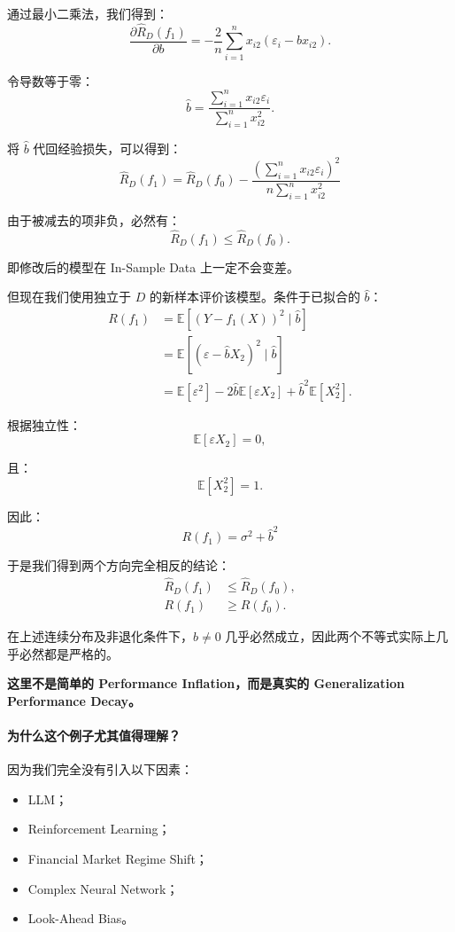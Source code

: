 通过最小二乘法，我们得到：
\[\frac{\partial\widehat R_D(f_1)}
{\partial b}
=
-\frac2n
\sum_{i=1}^{n}
x_{i2}(\varepsilon_i-bx_{i2}).\]

令导数等于零：
\[\hat b
=
\frac{\sum_{i=1}^{n}x_{i2}\varepsilon_i}
{\sum_{i=1}^{n}x_{i2}^2}.\]

将 \(\hat b\) 代回经验损失，可以得到：
\[\boxed{
\widehat R_D(f_1)
=
\widehat R_D(f_0)
-
\frac{
\left(\sum_{i=1}^{n}x_{i2}\varepsilon_i\right)^2
}{
n\sum_{i=1}^{n}x_{i2}^2
}
}\]

由于被减去的项非负，必然有：
\[\widehat R_D(f_1)
\leq
\widehat R_D(f_0).\]

即修改后的模型在 In-Sample Data 上一定不会变差。

但现在我们使用独立于 \(D\) 的新样本评价该模型。条件于已拟合的 \(\hat b\)：
\[\begin{aligned}
R(f_1)
&=
\mathbb E[(Y-f_1(X))^2\mid\hat b]\\
&=
\mathbb E[(\varepsilon-\hat bX_2)^2\mid\hat b]\\
&=
\mathbb E[\varepsilon^2]
-2\hat b\mathbb E[\varepsilon X_2]
+\hat b^2\mathbb E[X_2^2].
\end{aligned}\]

根据独立性：
\[\mathbb E[\varepsilon X_2]=0,\]

且：
\[\mathbb E[X_2^2]=1.\]

因此：
\[\boxed{
R(f_1)=\sigma^2+\hat b^2
}\]

于是我们得到两个方向完全相反的结论：
\[\boxed{
\begin{aligned}
\widehat R_D(f_1)
&\leq\widehat R_D(f_0),\\
R(f_1)
&\geq R(f_0).
\end{aligned}
}\]

在上述连续分布及非退化条件下，\(\hat b\neq0\) 几乎必然成立，因此两个不等式实际上几乎必然都是严格的。

\textbf{这里不是简单的 Performance Inflation，而是真实的 Generalization Performance Decay。}

\hypertarget{part-1-07-0001-ux4e3aux4ec0ux4e48ux8fd9ux4e2aux4f8bux5b50ux5c24ux5176ux503cux5f97ux7406ux89e3}{%
\paragraph{为什么这个例子尤其值得理解？}\label{part-1-07-0001-ux4e3aux4ec0ux4e48ux8fd9ux4e2aux4f8bux5b50ux5c24ux5176ux503cux5f97ux7406ux89e3}}

因为我们完全没有引入以下因素：

\begin{itemize}
\tightlist
\item
  LLM；
\item
  Reinforcement Learning；
\item
  Financial Market Regime Shift；
\item
  Complex Neural Network；
\item
  Look-Ahead Bias。
\end{itemize}

